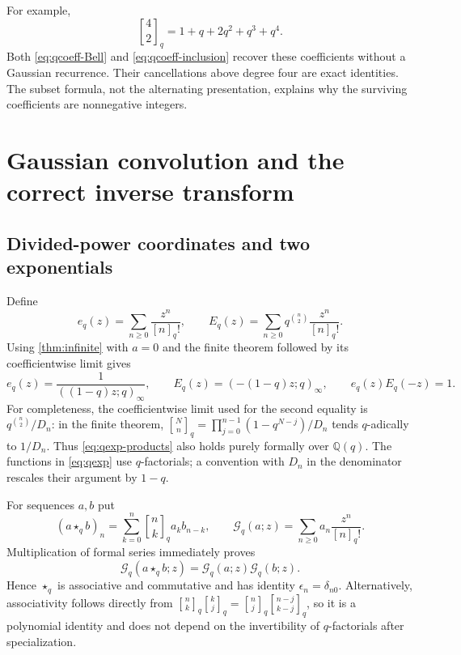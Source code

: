 \documentclass[11pt,a4paper]{article}
\numberwithin{equation}{section}
\theoremstyle{definition}
\theoremstyle{remark}
\newcommand{\Q}{\mathbb Q}
\newcommand{\qb}[2]{\genfrac{[}{]}{0pt}{}{#1}{#2}_{q}}
\newcommand{\qf}[1]{[#1]_{q}!}
\newcommand{\poch}[3]{(#1;#2)_{#3}}
\begin{document}
For example,
\begin{equation}\label{eq:G42}
 \qb42=1+q+2q^2+q^3+q^4.
\end{equation}
Both \eqref{eq:qcoeff-Bell} and \eqref{eq:qcoeff-inclusion} recover these
coefficients without a Gaussian recurrence. Their cancellations above degree
four are exact identities. The subset formula, not the alternating presentation,
explains why the surviving coefficients are nonnegative integers.

\section{Gaussian convolution and the correct inverse transform}\label{sec:transforms}

\subsection{Divided-power coordinates and two exponentials}
Define
\begin{equation}\label{eq:qexp}
 e_q(z)=\sum_{n\ge0}\frac{z^n}{\qf n},\qquad
 E_q(z)=\sum_{n\ge0}q^{\binom n2}\frac{z^n}{\qf n}.
\end{equation}
Using \cref{thm:infinite} with $a=0$ and the finite theorem followed by its
coefficientwise limit gives
\begin{equation}\label{eq:qexp-products}
 e_q(z)=\frac1{\poch{(1-q)z}q\infty},\qquad
 E_q(z)=\poch{-(1-q)z}q\infty,
 \qquad e_q(z)E_q(-z)=1.
\end{equation}
For completeness, the coefficientwise limit used for the second equality is
$q^{\binom n2}/D_n$: in the finite theorem,
$\qb Nn=\prod_{j=0}^{n-1}(1-q^{N-j})/D_n$ tends $q$-adically to $1/D_n$.
Thus \eqref{eq:qexp-products} also holds purely formally over $\Q(q)$.
The functions in \eqref{eq:qexp} use $q$-factorials; a convention with $D_n$ in
the denominator rescales their argument by $1-q$.

For sequences $a,b$ put
\begin{equation}\label{eq:qconv}
 (a\star_q b)_n=\sum_{k=0}^n\qb nk a_kb_{n-k},\qquad
 \mathscr G_q(a;z)=\sum_{n\ge0}a_n\frac{z^n}{\qf n}.
\end{equation}
Multiplication of formal series immediately proves
\begin{equation}\label{eq:qconv-series}
 \mathscr G_q(a\star_q b;z)=\mathscr G_q(a;z)\mathscr G_q(b;z).
\end{equation}
Hence $\star_q$ is associative and commutative and has identity
$\epsilon_n=\delta_{n0}$. Alternatively, associativity follows directly from
$\qb nk\qb kj=\qb nj\qb{n-j}{k-j}$, so it is a polynomial identity and does
not depend on the invertibility of $q$-factorials after specialization.
\end{document}
